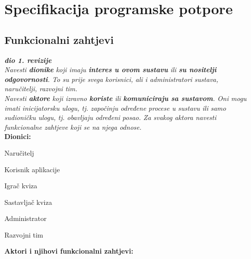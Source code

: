 \chapter{Specifikacija programske potpore}
		
	\section{Funkcionalni zahtjevi}
			
			\textbf{\textit{dio 1. revizije}}\\
			
			\textit{Navesti \textbf{dionike} koji imaju \textbf{interes u ovom sustavu} ili  \textbf{su nositelji odgovornosti}. To su prije svega korisnici, ali i administratori sustava, naručitelji, razvojni tim.}\\
				
			\textit{Navesti \textbf{aktore} koji izravno \textbf{koriste} ili \textbf{komuniciraju sa sustavom}. Oni mogu imati inicijatorsku ulogu, tj. započinju određene procese u sustavu ili samo sudioničku ulogu, tj. obavljaju određeni posao. Za svakog aktora navesti funkcionalne zahtjeve koji se na njega odnose.}\\
			
			
			\noindent \textbf{Dionici:}
			
			\begin{packed_enum}
				
				\item Naručitelj
				\item Korisnik aplikacije
				\begin{packed_enum}
					\item Igrač kviza
					\item Sastavljač kviza
				\end{packed_enum}				
				\item Administrator
				\item Razvojni tim
				
			\end{packed_enum}
			
			\noindent \textbf{Aktori i njihovi funkcionalni zahtjevi:}
			

